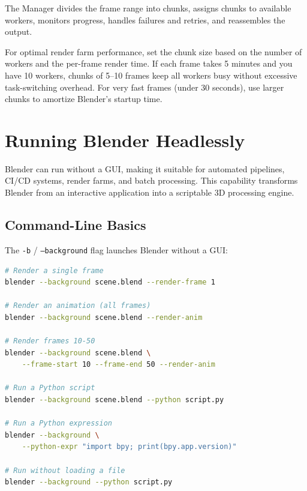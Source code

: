 The Manager divides the frame range into chunks, assigns chunks to available workers, monitors progress, handles failures and retries, and reassembles the output.

\begin{tipbox}
For optimal render farm performance, set the chunk size based on the number of workers and the per-frame render time. If each frame takes 5 minutes and you have 10 workers, chunks of 5--10 frames keep all workers busy without excessive task-switching overhead. For very fast frames (under 30 seconds), use larger chunks to amortize Blender's startup time.
\end{tipbox}


\section{Running Blender Headlessly}
\label{sec:scripting-headless}

Blender can run without a GUI, making it suitable for automated pipelines, CI/CD systems, render farms, and batch processing. This capability transforms Blender from an interactive application into a scriptable 3D processing engine.

\subsection{Command-Line Basics}

The \texttt{-b} / \texttt{--background} flag launches Blender without a GUI:

\begin{lstlisting}[language=bash]
# Render a single frame
blender --background scene.blend --render-frame 1

# Render an animation (all frames)
blender --background scene.blend --render-anim

# Render frames 10-50
blender --background scene.blend \
    --frame-start 10 --frame-end 50 --render-anim

# Run a Python script
blender --background scene.blend --python script.py

# Run a Python expression
blender --background \
    --python-expr "import bpy; print(bpy.app.version)"

# Run without loading a file
blender --background --python script.py
\end{lstlisting}

